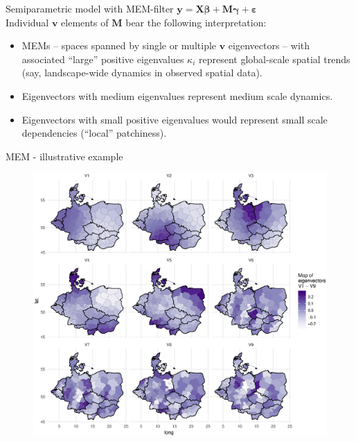 \documentclass{beamer}
\begin{document}
\begin{frame}{Semiparametric model with MEM-filter}
$\bm{y} = \bm{X \beta } + \bm{M \gamma} + \bm{\varepsilon}$\\
\medskip
Individual $\bm{v}$ elements of $\bm{M}$ bear the following interpretation:\\
\bigskip
\begin{itemize}
    \item  MEMs -- spaces spanned by single or multiple $\bm{v}$ eigenvectors -- with associated ``large'' positive eigenvalues $\kappa_i$ represent global-scale spatial trends (say, landscape-wide dynamics in observed spatial data). 
    \medskip
    \item Eigenvectors with medium eigenvalues represent medium scale dynamics. 
    \medskip
    \item Eigenvectors with small positive eigenvalues would represent small scale dependencies (``local'' patchiness).   
\end{itemize}
\end{frame}
\begin{frame}{MEM - illustrative example}
\vspace{-0.3cm}
\begin{figure}
	\includegraphics[width=.8\textwidth]{IMG/sp_Eigen.eps}
\end{figure}
\end{frame}
\end{document}
